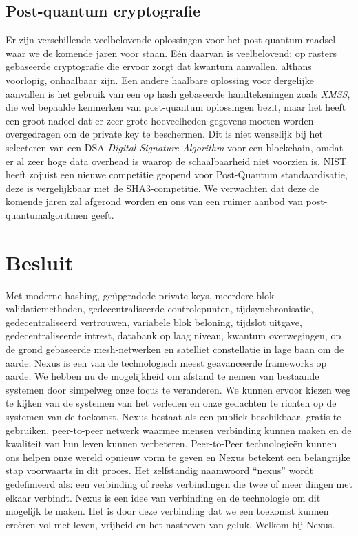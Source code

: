 \documentclass[11pt]{article}
\begin{document}
\subsection{Post-quantum cryptografie}

Er zijn verschillende veelbelovende oplossingen voor het post-quantum raadsel waar we de komende jaren voor staan. E\'en daarvan is veelbelovend: op rasters gebaseerde cryptografie die ervoor zorgt dat kwantum aanvallen, althans voorlopig, onhaalbaar zijn.
Een andere haalbare oplossing voor dergelijke aanvallen is het gebruik van een op hash gebaseerde handtekeningen zoals \textit{XMSS},  die wel bepaalde kenmerken van post-quantum oplossingen bezit, maar het heeft een groot nadeel dat er zeer grote hoeveelheden gegevens moeten worden overgedragen om de private key te beschermen.
Dit is niet wenselijk bij het selecteren van een DSA \textit{Digital Signature Algorithm} voor een blockchain, omdat er al zeer hoge data overhead is waarop de schaalbaarheid niet voorzien is.
NIST heeft zojuist een nieuwe competitie geopend voor Post-Quantum standaardisatie, deze is vergelijkbaar met de SHA3-competitie. We verwachten dat deze de komende jaren zal afgerond worden en ons van een ruimer aanbod van post-quantumalgoritmen  geeft. \cite{NIST_POST_QUANTUM} 

\section{Besluit}

Met moderne hashing, ge\"upgradede private keys, meerdere blok validatiemethoden, gedecentraliseerde controlepunten, tijdsynchronisatie, gedecentraliseerd vertrouwen, variabele blok beloning, tijdslot uitgave, gedecentraliseerde intrest, databank op laag niveau, kwantum overwegingen, op de grond gebaseerde mesh-netwerken en satelliet constellatie in lage baan om de aarde. Nexus is een van de technologisch meest geavanceerde frameworks op aarde. We hebben nu de mogelijkheid om afstand te nemen van bestaande systemen door simpelweg onze focus te veranderen. We kunnen ervoor kiezen weg te kijken van de systemen van het verleden en onze gedachten te richten op de systemen van de toekomst. Nexus bestaat als een publiek beschikbaar, gratis te gebruiken, peer-to-peer netwerk waarmee mensen verbinding kunnen maken en de kwaliteit van hun leven kunnen verbeteren. Peer-to-Peer technologie\"en kunnen ons helpen onze wereld opnieuw vorm te geven en Nexus betekent een belangrijke stap voorwaarts in dit proces. Het zelfstandig naamwoord ``nexus'' wordt gedefinieerd als: een verbinding of reeks verbindingen die twee of meer dingen met elkaar verbindt. Nexus is een idee van verbinding en de technologie om dit mogelijk te maken. Het is door deze verbinding dat we een toekomst kunnen cre\"eren vol met leven, vrijheid en het nastreven van geluk. Welkom bij Nexus.
\pagebreak
\end{document}
